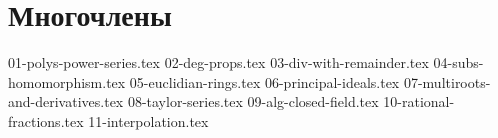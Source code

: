 \section{Многочлены}
{01-polys-power-series.tex}
{02-deg-props.tex}
{03-div-with-remainder.tex}
{04-subs-homomorphism.tex}
{05-euclidian-rings.tex}
{06-principal-ideals.tex}
{07-multiroots-and-derivatives.tex}
{08-taylor-series.tex}
{09-alg-closed-field.tex}
{10-rational-fractions.tex}
{11-interpolation.tex}
